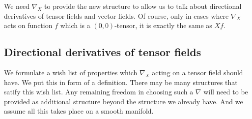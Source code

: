 We need $\nabla_X$ to provide the new structure to allow us to talk about directional derivatives of tensor fields and vector fields. Of course, only in cases where $\nabla_X$ acts on function $f$ which is a $(0,0)$-tensor, it is exactly the same as $Xf$. 

\subsection{Directional derivatives of tensor fields}
We formulate a wish list of properties which $\nabla_X$ acting on a tensor field should have. We put this in form of a definition. There may be many structures that satify this wish list. Any remaining freedom in choosing such a $\nabla$ will need to be provided as additional structure beyond the structure we already have. And we assume all this takes place on a smooth manifold.

